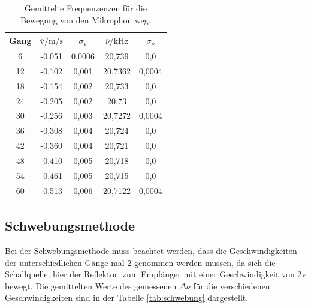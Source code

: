 \begin{table}
  \centering
  \caption{Gemittelte Frequenzenzen für die Bewegung von den Mikrophon weg.}
  \label{tab:rückwärts}
  \begin{tabular}{c c c c c}
    \toprule
Gang &  $\overline{\text{v}}/\si{\meter\per\second}$ & $\sigma_{\text{v}}$
 & $\overline{\nu}/\si{\kilo\hertz}$ & $\sigma_{\nu}$\\
    \midrule
    6  & -0,051 & 0,0006   & 20,739  & 0,0\\
    12 & -0,102 & 0,001    & 20,7362 & 0,0004\\
    18 & -0,154 & 0,002    & 20,733  & 0,0\\
    24 & -0,205 & 0,002    & 20,73   & 0,0\\
    30 & -0,256 & 0,003    & 20,7272 & 0,0004\\
    36 & -0,308 & 0,004    & 20,724  & 0,0\\
    42 & -0,360 & 0,004    & 20,721  & 0,0\\
    48 & -0,410 & 0,005    & 20,718  & 0,0\\
    54 & -0,461 & 0,005    & 20,715  & 0,0\\
    60 & -0,513 & 0,006    & 20,7122 & 0,0004\\

    \bottomrule
  \end{tabular}
\end{table}


\subsection{Schwebungsmethode}
Bei der Schwebungsmethode muss beachtet werden, dass die
Geschwindigkeiten der unterschiedlichen Gänge mal 2
genommen werden müssen, da sich die Schallquelle,
hier der Reflektor,
zum Empfänger mit einer Geschwindigkeit
von 2v bewegt. Die gemittelten Werte des gemessenen $\Delta\nu$
für die verschiedenen Geschwindigkeiten
sind in der Tabelle \ref{tab:schwebung} dargestellt.

